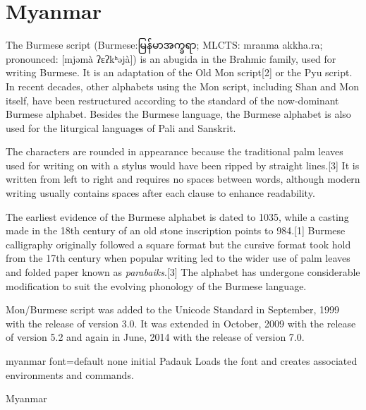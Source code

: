 \section{Myanmar}
\label{s:myanmar}


The Burmese script (Burmese:{\myanmar မြန်မာအက္ခရာ}; MLCTS: mranma akkha.ra; pronounced: [mjəmà ʔɛʔkʰəjà]) is an abugida in the Brahmic family, used for writing Burmese. It is an adaptation of the Old Mon script[2] or the Pyu script. In recent decades, other alphabets using the Mon script, including Shan and Mon itself, have been restructured according to the standard of the now-dominant Burmese alphabet. Besides the Burmese language, the Burmese alphabet is also used for the liturgical languages of Pali and Sanskrit.

The characters are rounded in appearance because the traditional palm leaves used for writing on with a stylus would have been ripped by straight lines.[3] It is written from left to right and requires no spaces between words, although modern writing usually contains spaces after each clause to enhance readability.

The earliest evidence of the Burmese alphabet is dated to 1035, while a casting made in the 18th century of an old stone inscription points to 984.[1] Burmese calligraphy originally followed a square format but the cursive format took hold from the 17th century when popular writing led to the wider use of palm leaves and folded paper known as \emph{parabaiks}.[3] The alphabet has undergone considerable modification to suit the evolving phonology of the Burmese language.

Mon/Burmese script was added to the Unicode Standard in September, 1999 with the release of version 3.0. It was extended in October, 2009 with the release of version 5.2 and again in June, 2014 with the release of version 7.0.

\begin{docKey}[phd]{myanmar font}{=}{default none initial Padauk}
Loads the font and creates associated environments and commands.
\end{docKey}

\begin{scriptexample}[]{Myanmar}
\end{scriptexample}


